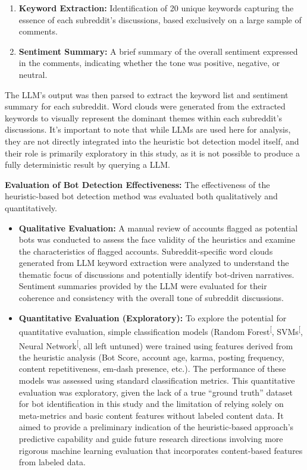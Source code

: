 \documentclass[
  12pt,
  letterpaper,
  DIV=11,
  numbers=noendperiod,
  abstract]{scrartcl}
\providecommand{\tightlist}{%
  \setlength{\itemsep}{0pt}\setlength{\parskip}{0pt}}\usepackage{longtable,booktabs,array}
\begin{document}
\begin{enumerate}
\def\labelenumi{\arabic{enumi}.}
\tightlist
\item
  \textbf{Keyword Extraction:} Identification of 20 unique keywords
  capturing the essence of each subreddit's discussions, based
  exclusively on a large sample of comments.
\item
  \textbf{Sentiment Summary:} A brief summary of the overall sentiment
  expressed in the comments, indicating whether the tone was positive,
  negative, or neutral.
\end{enumerate}

The LLM's output was then parsed to extract the keyword list and
sentiment summary for each subreddit. Word clouds were generated from
the extracted keywords to visually represent the dominant themes within
each subreddit's discussions. It's important to note that while LLMs are
used here for analysis, they are not directly integrated into the
heuristic bot detection model itself, and their role is primarily
exploratory in this study, as it is not possible to produce a fully
deterministic result by querying a LLM.

\textbf{Evaluation of Bot Detection Effectiveness:} The effectiveness of
the heuristic-based bot detection method was evaluated both
qualitatively and quantitatively.

\begin{itemize}
\item
  \textbf{Qualitative Evaluation:} A manual review of accounts flagged
  as potential bots was conducted to assess the face validity of the
  heuristics and examine the characteristics of flagged accounts.
  Subreddit-specific word clouds generated from LLM keyword extraction
  were analyzed to understand the thematic focus of discussions and
  potentially identify bot-driven narratives. Sentiment summaries
  provided by the LLM were evaluated for their coherence and consistency
  with the overall tone of subreddit discussions.
\item
  \textbf{Quantitative Evaluation (Exploratory):} To explore the
  potential for quantitative evaluation, simple classification models
  (Random
  Forest\textsuperscript{{[}\citeproc{ref-breiman2001random}{5}{]}},
  SVMs\textsuperscript{{[}\citeproc{ref-cortes1995support}{27}{]}},
  Neural
  Network\textsuperscript{{[}\citeproc{ref-lecun2015deep}{28}{]}}, all
  left untuned) were trained using features derived from the heuristic
  analysis (Bot Score, account age, karma, posting frequency, content
  repetitiveness, em-dash presence, etc.). The performance of these
  models was assessed using standard classification metrics. This
  quantitative evaluation was exploratory, given the lack of a true
  ``ground truth'' dataset for bot identification in this study and the
  limitation of relying solely on meta-metrics and basic content
  features without labeled content data. It aimed to provide a
  preliminary indication of the heuristic-based approach's predictive
  capability and guide future research directions involving more
  rigorous machine learning evaluation that incorporates content-based
  features from labeled data.
\end{itemize}
\end{document}
